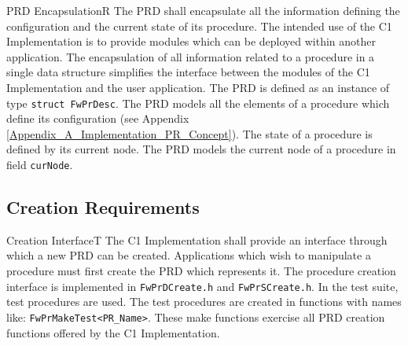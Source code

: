 \documentclass[a4paper,10pt]{article}
\newenvironment{fw_req}[6]
{\addtocounter{subsubsection}{1}
	\hspace{0.2cm}\textbf{FW-\arabic{section}.\arabic{subsection}.\arabic{subsubsection}/#2
	\hspace{0.8cm} #1}
	\vspace{-10pt}
\begin{longtable}{p{2.7cm}P{8.5cm}}
\hline
\textsc{Requirement} & #3 \\
\textsc{Justification} & #4 \\
\textsc{Implementation} & #5  \\ 
\textsc{Verification} & #6  \\
\hline
}
{\end{longtable}}
\begin{document}
\begin{fw_req}{PRD Encapsulation}{R}
{The PRD shall encapsulate all the information defining the configuration 
and the current state of its procedure.}
{The intended use of the C1 Implementation is to provide modules which can 
be deployed within another application. 
The encapsulation of all information related to a procedure in a single data structure simplifies 
the interface between the modules of the C1 Implementation and the user application.}
{The PRD is defined as an instance of type \texttt{struct FwPrDesc}.} 
{The PRD models all the elements of a procedure which define its configuration (see Appendix 
\ref{Appendix_A_Implementation_PR_Concept}).
The state of a procedure is defined by its current node.
The PRD models the current node of a procedure in field \texttt{curNode}.}
\end{fw_req}  

\subsection{Creation Requirements}\label{req:creationInterfacePRD}

\begin{fw_req}{Creation Interface}{T}
{ The C1 Implementation shall provide an interface through which a new PRD 
can be created.}
{Applications which wish to manipulate a procedure must first create the 
PRD which represents it.}
{The procedure creation interface is implemented in 
\texttt{FwPrDCreate.h} and \texttt{FwPrSCreate.h}.} 
{In the test suite, test procedures are used. The test procedures are 
created in functions with names like: \texttt{FwPrMakeTest<PR\_Name>}. 
These make functions exercise all PRD creation functions offered by the C1 Implementation.}
\end{fw_req}
\end{document}

